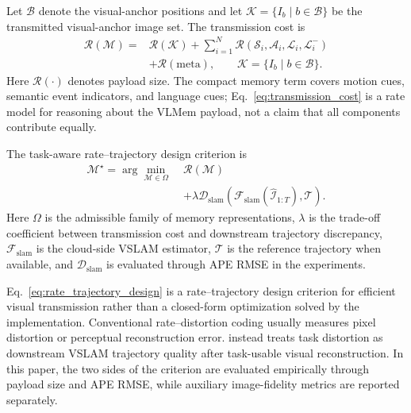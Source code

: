 Let \(\mathcal{B}\) denote the visual-anchor positions and let \(\mathcal{K}=\{I_b\mid b\in\mathcal{B}\}\) be the transmitted visual-anchor image set. The transmission cost is
\begin{equation}
\begin{aligned}
\mathcal{R}(\mathcal{M})
=&\mathcal{R}(\mathcal{K})
+\sum_{i=1}^{N}
\mathcal{R}(\mathcal{S}_i,\mathcal{A}_i,\mathcal{L}_i,\mathcal{L}_i^{-})\\
&+\mathcal{R}(\mathrm{meta}),\qquad
\mathcal{K}=\{I_b\mid b\in\mathcal{B}\}.
\end{aligned}
\label{eq:transmission_cost}
\end{equation}
Here \(\mathcal{R}(\cdot)\) denotes payload size. The compact memory term covers motion cues, semantic event indicators, and language cues; Eq.~\eqref{eq:transmission_cost} is a rate model for reasoning about the VLMem payload, not a claim that all components contribute equally.

The task-aware rate--trajectory design criterion is
\begin{equation}
\begin{aligned}
\mathcal{M}^{\star}
=\arg\min_{\mathcal{M}\in\Omega}\;
&\mathcal{R}(\mathcal{M})\\
&+\lambda\mathcal{D}_{\mathrm{slam}}\!\left(
\mathcal{F}_{\mathrm{slam}}(\widehat{\mathcal{I}}_{1:T}),
\mathcal{T}\right).
\end{aligned}
\label{eq:rate_trajectory_design}
\end{equation}
Here \(\Omega\) is the admissible family of memory representations, \(\lambda\) is the trade-off coefficient between transmission cost and downstream trajectory discrepancy, \(\mathcal{F}_{\mathrm{slam}}\) is the cloud-side VSLAM estimator, \(\mathcal{T}\) is the reference trajectory when available, and \(\mathcal{D}_{\mathrm{slam}}\) is evaluated through APE RMSE in the experiments.

Eq.~\eqref{eq:rate_trajectory_design} is a rate--trajectory design criterion for efficient visual transmission rather than a closed-form optimization solved by the implementation. Conventional rate--distortion coding usually measures pixel distortion or perceptual reconstruction error. \VLMemCodec{} instead treats task distortion as downstream VSLAM trajectory quality after task-usable visual reconstruction. In this paper, the two sides of the criterion are evaluated empirically through payload size and APE RMSE, while auxiliary image-fidelity metrics are reported separately.

